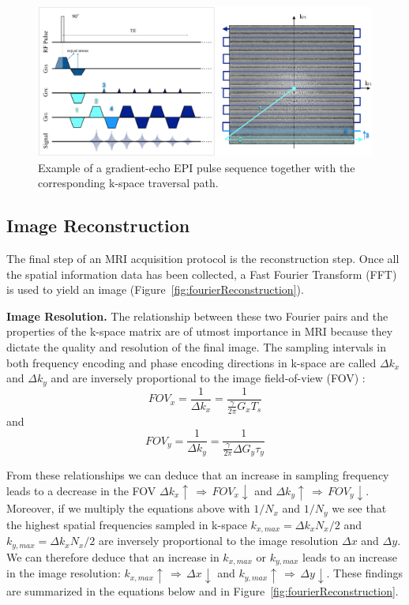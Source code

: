 \begin{figure}[ht]
    \centering
    \includegraphics[width=1\textwidth,keepaspectratio]{images/mri/PulseSeqEPI}
    \caption{Example of a gradient-echo EPI pulse sequence together with the corresponding k-space traversal path.}
    \label{fig:PulseSeqEPI}
\end{figure}

\hfill

\subsection{Image Reconstruction}

The final step of an MRI acquisition protocol is the reconstruction step.
Once all the spatial information data has been collected, a Fast Fourier Transform (FFT) is used to yield an image (Figure~\ref{fig:fourierReconstruction}). 

\hfill

\textbf{Image Resolution.} The relationship between these two Fourier pairs and the properties of the k-space matrix are of utmost importance in MRI because they dictate the quality and resolution of the final image.
The sampling intervals in both frequency encoding and phase encoding directions in k-space are called $\Delta k_x$ and $\Delta k_y$ and are inversely proportional to the image field-of-view (FOV) \cite{Deshmane2012}:
\begin{equation} \label{eq:1210}
    FOV_x = \frac{1}{\Delta k_x} = \frac{1}{\frac{\gamma}{2 \pi} G_x T_s}
\end{equation}
and
\begin{equation} \label{eq:1211}
    FOV_y = \frac{1}{\Delta k_y} = \frac{1}{\frac{\gamma}{2 \pi} \Delta G_y \tau_y}
\end{equation}

From these relationships we can deduce that an increase in sampling frequency leads to a decrease in the FOV $\Delta k_x \uparrow \, \Rightarrow \, FOV_x \downarrow$ and $\Delta k_y \uparrow \, \Rightarrow \, FOV_y \downarrow$.
Moreover, if we multiply the equations above with $1/N_x$ and $1/N_y$ we see that the highest spatial frequencies sampled in k-space $k_{x,max} = \Delta k_x N_x/2 $ and $k_{y,max} = \Delta k_x N_x/2 $ are inversely proportional to the image resolution $\Delta x$ and $\Delta y$.
We can therefore deduce that an increase in $k_{x,max}$ or $k_{y,max}$ leads to an increase in the image resolution: $k_{x,max} \uparrow \, \Rightarrow \, \Delta x \downarrow$ and $k_{y,max} \uparrow \, \Rightarrow \, \Delta y \downarrow$. 
These findings are summarized in the equations below and in Figure~\ref{fig:fourierReconstruction}.

